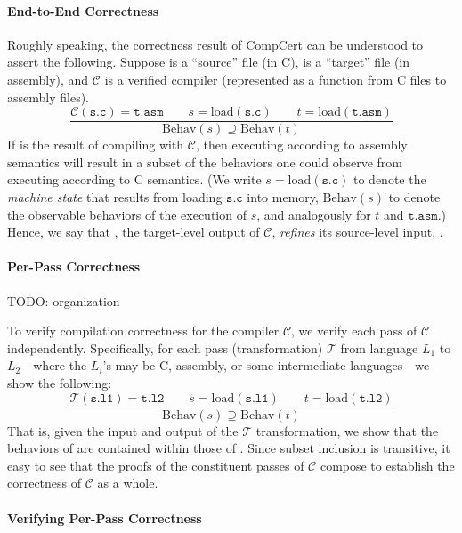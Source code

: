 \paragraph{End-to-End Correctness}

Roughly speaking, the correctness result of CompCert can be understood to assert the following.
Suppose  is a ``source'' file (in C),  is a ``target'' file (in assembly), and
$\mathcal{C}$ is a verified compiler (represented as a function from C files to assembly files).
\[
\frac{
\mathcal{C}(\mathtt{s.c}) = \mathtt{t.asm} \qquad
s = \mathrm{load}(\mathtt{s.c})\qquad
t = \mathrm{load}(\mathtt{t.asm})}
{\mathrm{Behav}(s) \supseteq \mathrm{Behav}(t)}
\]
If  is the result of compiling  with $\mathcal{C}$, then executing
 according to assembly semantics will result in a subset of the behaviors one could
observe from executing  according to C semantics.  (We write
$s = \mathrm{load}(\mathtt{s.c})$ to denote the \emph{machine state} that results from loading
$\mathtt{s.c}$ into memory, $\mathrm{Behav}(s)$ to denote the observable behaviors of the execution
of $s$, and analogously for $t$ and $\mathtt{t.asm}$.)  Hence, we say that , the
target-level output of $\mathcal{C}$, \emph{refines} its source-level input, .


\paragraph{Per-Pass Correctness}

TODO: organization

To verify compilation correctness for the compiler $\mathcal{C}$, we verify each pass of
$\mathcal{C}$ independently.  Specifically, for each pass (transformation) $\mathcal{T}$ from
language $L_1$ to $L_2$---where the $L_i$'s may be C, assembly, or some intermediate languages---we
show the following:
\[
\frac{
\mathcal{T}(\mathtt{s.l1}) = \mathtt{t.l2} \qquad
s = \mathrm{load}(\mathtt{s.l1}) \qquad
t = \mathrm{load}(\mathtt{t.l2})
}
{
\mathrm{Behav}(s) \supseteq \mathrm{Behav}(t)
}
\]
That is, given the input  and output  of the $\mathcal{T}$ transformation, we
show that the behaviors of  are contained within those of .  Since subset
inclusion is transitive, it easy to see that the proofs of the constituent passes of $\mathcal{C}$
compose to establish the correctness of $\mathcal{C}$ as a whole.


\paragraph{Verifying Per-Pass Correctness}


